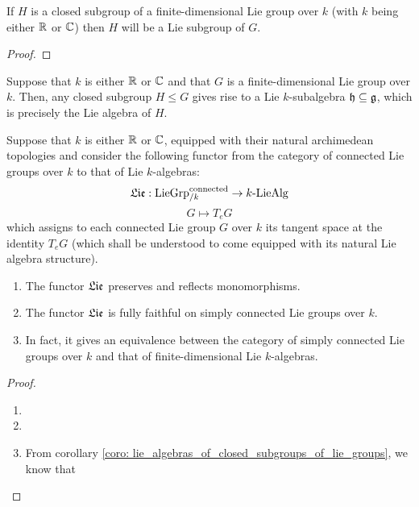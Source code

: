         \begin{lemma} \label{lemma: cartan_closed_subgroup_theorem}
            If $H$ is a closed subgroup of a finite-dimensional Lie group over $k$ (with $k$ being either $\mathbb{R}$ or $\mathbb{C}$) then $H$ will be a Lie subgroup of $G$. 
        \end{lemma}
            \begin{proof}
                
            \end{proof}
        \begin{corollary} \label{coro: lie_algebras_of_closed_subgroups_of_lie_groups}
            Suppose that $k$ is either $\mathbb{R}$ or $\mathbb{C}$ and that $G$ is a finite-dimensional Lie group over $k$. Then, any closed subgroup $H \leq G$ gives rise to a Lie $k$-subalgebra $\mathfrak{h} \subseteq \mathfrak{g}$, which is precisely the Lie algebra of $H$.
        \end{corollary}
        \begin{theorem} \label{theorem: fundamental_theorem_of_lie_theory}
            Suppose that $k$ is either $\mathbb{R}$ or $\mathbb{C}$, equipped with their natural archimedean topologies and consider the following functor from the category of connected Lie groups over $k$ to that of Lie $k$-algebras:
                $$\mathfrak{Lie}: \mathrm{Lie}\mathrm{Grp}_{/k}^{\mathrm{connected}} \to k\text{-}\mathrm{Lie}\mathrm{Alg}$$
                $$G \mapsto T_e G$$
            which assigns to each connected Lie group $G$ over $k$ its tangent space at the identity $T_eG$ (which shall be understood to come equipped with its natural Lie algebra structure). 
                \begin{enumerate}
                    \item The functor $\mathfrak{Lie}$ preserves and reflects monomorphisms.
                    \item The functor $\mathfrak{Lie}$ is fully faithful on simply connected Lie groups over $k$. 
                    \item In fact, it gives an equivalence between the category of simply connected Lie groups over $k$ and that of finite-dimensional Lie $k$-algebras.
                \end{enumerate}
        \end{theorem}
            \begin{proof}
                \noindent
                \begin{enumerate}
                    \item 
                    \item 
                    \item From corollary \ref{coro: lie_algebras_of_closed_subgroups_of_lie_groups}, we know that 
                \end{enumerate}
            \end{proof}
        
